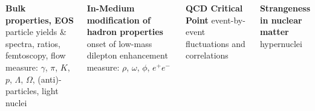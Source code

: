 \documentclass[dvipsnames] {beamer}
\begin{document}
\begin{frame}
{\begin{columns}[t]
                 \begin{block}{\bf \centering Bulk properties, EOS}
                   \centering
                       {\color{ForestGreen} particle yields \& spectra, ratios, femtoscopy, flow} \\
                       {\color {Red} measure: $\gamma$, $\pi$, $K$, $p$, $\Lambda$, $\Omega$, (anti)-particles, light nuclei}
                 \end{block}
                 \vskip -0.3cm
                 \begin{block}{\bf \centering In-Medium modification of hadron properties}
                   \centering 
                       {\color{ForestGreen} onset of low-mass dilepton enhancement} \\
                       {\color{Red} measure: $\rho$, $\omega$, $\phi$, $e^{+}e^{-}$}
                 \end{block}
                 \vskip -0.3cm
                 \begin{block}{\bf \centering QCD Critical Point}
                   \centering 
                       {\color{ForestGreen} event-by-event fluctuations and correlations}
                 \end{block}
                 \vskip -0.3cm
                 \begin{block}{\bf \centering Strangeness in nuclear matter}
                   \centering 
                       {\color{ForestGreen} hypernuclei}
                 \end{block}
               \end{columns}
             }
\end{frame}
\end{document}

